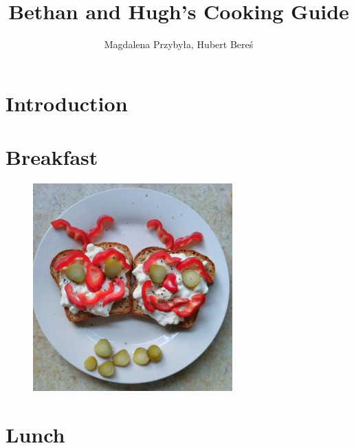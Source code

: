 \documentclass[%
titlepage,
b5paper,
twoside,
11pt
]{book}
\begin{document}
\frontmatter
\title{Bethan and Hugh's Cooking Guide}
\author{Magdalena Przybyła, Hubert Bereś}

\maketitle
\thispagestyle{empty}
\newpage

\tableofcontents

\mainmatter
\chapter{Introduction}


\chapter{Breakfast}
\begin{figure}[h]
	\centering
	\includegraphics[height=8cm,angle=0]{pic/breakfast}
\end{figure}


\newpage

\newpage

\newpage

\newpage

\newpage

\newpage

\chapter{Lunch}
\end{document}
